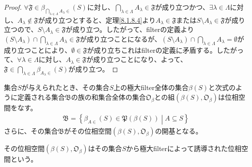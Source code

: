 \documentclass[dvipdfmx]{jsarticle}
\begin{document}
\begin{proof}
$\mathfrak{\forall F \in}\beta_{\bigcap_{\lambda \in \varLambda} A_{\lambda} \in}(S)$に対し、$\bigcap_{\lambda \in \varLambda} A_{\lambda}\in \mathfrak{F}$が成り立つかつ、$\exists\lambda \in \varLambda$に対し、$A_{\lambda}\notin \mathfrak{F}$が成り立つとすると、定理\ref{8.1.8.4}より$A_{\lambda}\in \mathfrak{F}$または$S \setminus A_{\lambda}\in \mathfrak{F}$が成り立つので、$S \setminus A_{\lambda}\in \mathfrak{F}$が成り立つ。したがって、filterの定義より$\left( S \setminus A_{\lambda} \right) \cap \bigcap_{\lambda \in \varLambda} A_{\lambda}\in \mathfrak{F}$が成り立つことになるが、$\left( S \setminus A_{\lambda} \right) \cap \bigcap_{\lambda \in \varLambda} A_{\lambda} = \emptyset$が成り立つことにより、$\emptyset \in \mathfrak{F}$が成り立ちこれはfilterの定義に矛盾する。したがって、$\forall\lambda \in \varLambda$に対し、$A_{\lambda}\in \mathfrak{F}$が成り立つことになり、よって、$\mathfrak{F}\in \bigcap_{\lambda \in \varLambda} {\beta_{A_{\lambda} \in}(S)}$が成り立つ。
\end{proof}
\begin{thm}\label{8.1.8.11}
集合$S$が与えられたとき、その集合$S$上の極大filter全体の集合$\beta(S)$と次式のように定義される集合$\mathfrak{B}$の族の和集合全体の集合$\mathfrak{O}_{\beta}$との組$\left( \beta(S),\mathfrak{O}_{\beta} \right)$は位相空間をなす。
\begin{align*}
\mathfrak{B} = \left\{ \beta_{A \in}(S)\in \mathfrak{P}\left( \beta(S) \right) \middle| A \subseteq S \right\}
\end{align*}
さらに、その集合$\mathfrak{B}$がその位相空間$\left( \beta(S),\mathfrak{O}_{\beta} \right)$の開基となる。
\end{thm}
\begin{dfn}
その位相空間$\left( \beta(S),\mathfrak{O}_{\beta} \right)$はその集合$S$から極大filterによって誘導された位相空間という。
\end{dfn}
\end{document}
